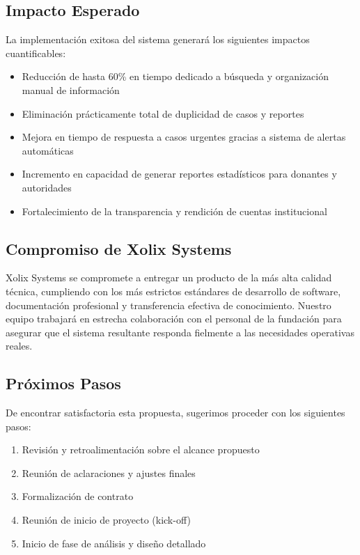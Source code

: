 \documentclass[12pt,letterpaper]{article}
\begin{document}
\subsection{Impacto Esperado}

La implementación exitosa del sistema generará los siguientes impactos cuantificables:

\begin{itemize}
    \item Reducción de hasta 60\% en tiempo dedicado a búsqueda y organización manual de información
    \item Eliminación prácticamente total de duplicidad de casos y reportes
    \item Mejora en tiempo de respuesta a casos urgentes gracias a sistema de alertas automáticas
    \item Incremento en capacidad de generar reportes estadísticos para donantes y autoridades
    \item Fortalecimiento de la transparencia y rendición de cuentas institucional
\end{itemize}

\subsection{Compromiso de Xolix Systems}

Xolix Systems se compromete a entregar un producto de la más alta calidad técnica, cumpliendo con los más estrictos estándares de desarrollo de software, documentación profesional y transferencia efectiva de conocimiento. Nuestro equipo trabajará en estrecha colaboración con el personal de la fundación para asegurar que el sistema resultante responda fielmente a las necesidades operativas reales.

\subsection{Próximos Pasos}

De encontrar satisfactoria esta propuesta, sugerimos proceder con los siguientes pasos:

\begin{enumerate}
    \item Revisión y retroalimentación sobre el alcance propuesto
    \item Reunión de aclaraciones y ajustes finales
    \item Formalización de contrato
    \item Reunión de inicio de proyecto (kick-off)
    \item Inicio de fase de análisis y diseño detallado
\end{enumerate}
\end{document}
